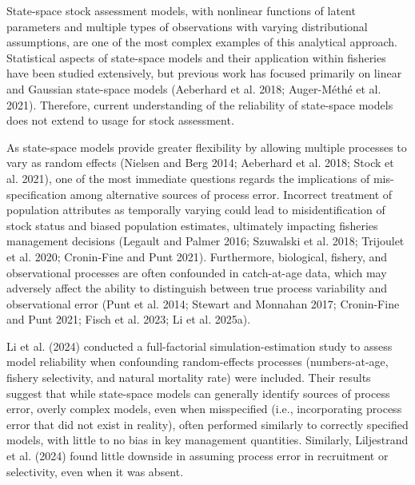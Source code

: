 \documentclass[
  12pt,
]{article}
\begin{document}
State-space stock assessment models, with nonlinear functions of latent
parameters and multiple types of observations with varying
distributional assumptions, are one of the most complex examples of this
analytical approach. Statistical aspects of state-space models and their
application within fisheries have been studied extensively, but previous
work has focused primarily on linear and Gaussian state-space models
(Aeberhard et al. 2018; {Auger-Méthé et al.} 2021). Therefore, current
understanding of the reliability of state-space models does not extend
to usage for stock assessment.

As state-space models provide greater flexibility by allowing multiple
processes to vary as random effects (Nielsen and Berg 2014; Aeberhard et
al. 2018; Stock et al. 2021), one of the most immediate questions
regards the implications of mis-specification among alternative sources
of process error. Incorrect treatment of population attributes as
temporally varying could lead to misidentification of stock status and
biased population estimates, ultimately impacting fisheries management
decisions (Legault and Palmer 2016; Szuwalski et al. 2018; Trijoulet et
al. 2020; Cronin-Fine and Punt 2021). Furthermore, biological, fishery,
and observational processes are often confounded in catch-at-age data,
which may adversely affect the ability to distinguish between true
process variability and observational error (Punt et al. 2014; Stewart
and Monnahan 2017; Cronin-Fine and Punt 2021; Fisch et al. 2023; Li et
al. 2025a).

Li et al. (2024) conducted a full-factorial simulation-estimation study
to assess model reliability when confounding random-effects processes
(numbers-at-age, fishery selectivity, and natural mortality rate) were
included. Their results suggest that while state-space models can
generally identify sources of process error, overly complex models, even
when misspecified (i.e., incorporating process error that did not exist
in reality), often performed similarly to correctly specified models,
with little to no bias in key management quantities. Similarly,
Liljestrand et al. (2024) found little downside in assuming process
error in recruitment or selectivity, even when it was absent.
\end{document}
